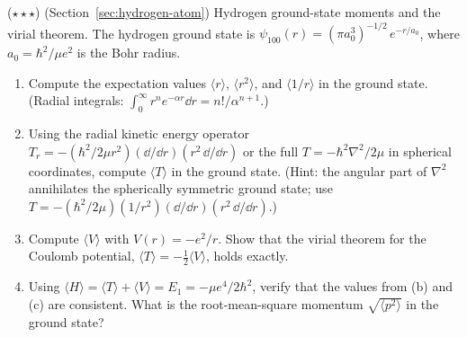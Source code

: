 \begin{problemset}
\item ($\star\star\star$) (Section~\ref{sec:hydrogen-atom}) Hydrogen ground-state moments and the virial theorem. The hydrogen ground state is $\psi_{100}(r) = (\pi a_0^3)^{-1/2}\,e^{-r/a_0}$, where $a_0 = \hbar^2/\mu e^2$ is the Bohr radius.
\begin{enumerate}
\item[(a)] Compute the expectation values $\langle r\rangle$, $\langle r^2\rangle$, and $\langle 1/r\rangle$ in the ground state. (Radial integrals: $\int_0^\infty r^n e^{-\alpha r}\dd r = n!/\alpha^{n+1}$.)
\item[(b)] Using the radial kinetic energy operator $T_r = -(\hbar^2/2\mu r^2)(\dd/\dd r)(r^2\,\dd/\dd r)$ or the full $T = -\hbar^2\nabla^2/2\mu$ in spherical coordinates, compute $\langle T\rangle$ in the ground state. (Hint: the angular part of $\nabla^2$ annihilates the spherically symmetric ground state; use $T = -(\hbar^2/2\mu)(1/r^2)(\dd/\dd r)(r^2\,\dd/\dd r)$.)
\item[(c)] Compute $\langle V\rangle$ with $V(r) = -e^2/r$. Show that the virial theorem for the Coulomb potential, $\langle T\rangle = -\frac12\langle V\rangle$, holds exactly.
\item[(d)] Using $\langle H\rangle = \langle T\rangle + \langle V\rangle = E_1 = -\mu e^4/2\hbar^2$, verify that the values from (b) and (c) are consistent. What is the root-mean-square momentum $\sqrt{\langle p^2\rangle}$ in the ground state?
\end{enumerate}


\end{problemset}
